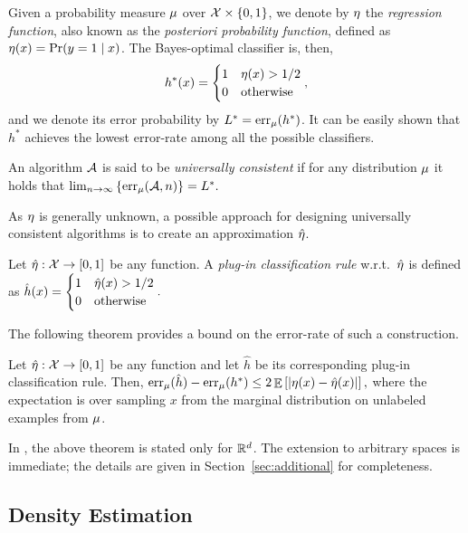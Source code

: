 \documentclass[12pt,a4paper,oneside,onecolumn]{book}
\begin{document}
Given a probability measure $\mu$ over $\mathcal{X} \times \{0,1\}$, we denote by $\eta$ the {\em regression function}, also known as the {\em posteriori probability function}, 
defined as
$\eta(x) = \Pr(y=1\mid x)$.
The Bayes-optimal classifier is, then,
\[
h^*(x) = \begin{cases}
  1  & \eta(x) > 1/2 \\
  0 & \text{otherwise}
\end{cases},
\]
and we denote its error probability by 
$L^* = \operatorname{err}_\mu(h^*)$.
It can be easily shown that $h^*$ achieves the lowest error-rate among all the possible classifiers. 

\begin{definition}
An algorithm $\mathcal{A}$ is said to be \emph{universally consistent} if for any distribution $\mu$ it holds that
$
\lim_{n\to\infty}\left\{\operatorname{err}_\mu(\mathcal{A},n)\right\} = L^*.
$
\end{definition}

As $\eta$ is generally unknown, a possible approach for designing universally consistent algorithms is to create an approximation $\hat{\eta}$.

\begin{definition}
Let $\hat{\eta}:\mathcal{X}\rightarrow[0,1]$ be any function. 
A \emph{plug-in classification rule} w.r.t.\ $\hat{\eta}$ is defined as 
$
\hat{h}(x) = \begin{cases}
  1  & \hat{\eta}(x) > 1/2 \\
  0 & \text{otherwise}
\end{cases}.
$
\end{definition}

The following theorem provides a bound on the error-rate of such a construction. 
\begin{theorem}
Let $\hat{\eta}:\mathcal{X}\rightarrow[0,1]$ be any function and let $\hat{h}$ be its corresponding plug-in classification rule. Then,
\label{thm:plugin}
  $\operatorname{err}_\mu(\hat{h}) - \operatorname{err}_\mu(h^*) 
  \leq 
  2 \mathop{\mathbb{E}}\left[\lvert\eta(x)-\hat{\eta}(x)\rvert\right],$ 
  where the expectation is over sampling $x$ from the marginal distribution on unlabeled examples from $\mu$.
\end{theorem}

In \cite{devroye2013probabilistic}, the above theorem is stated only for $\mathbb{R}^d$. The extension to arbitrary spaces is immediate; the details are given in Section~\ref{sec:additional} for completeness.

\subsection{Density Estimation}
\end{document}
